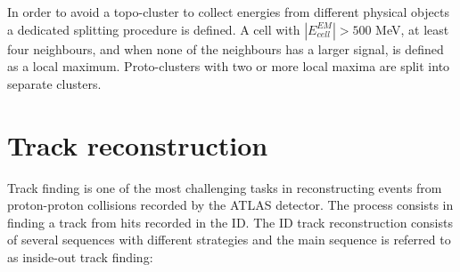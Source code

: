 \documentclass[a4paper, oneside]{book}
\begin{document}
			In order to avoid a topo-cluster to collect energies from different physical objects a dedicated splitting procedure is defined. A cell with $|E_{cell}^{EM}| > 500$ MeV, at least four neighbours, and when none of the neighbours has a larger signal, is defined as a local maximum. Proto-clusters with two or more local maxima are split into separate clusters.
			
		
		\section{Track reconstruction}\label{section:Track reco}
		Track finding is one of the most challenging tasks in reconstructing events from proton-proton  collisions  recorded  by  the  ATLAS  detector. The process consists in finding a track from hits recorded in the ID. The ID track reconstruction consists of several sequences with different strategies and the main sequence is referred to as inside-out track finding: \cite{ID reco alg}
\end{document}
